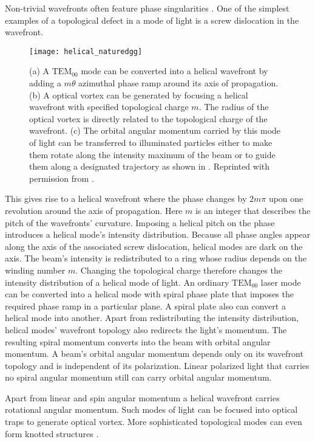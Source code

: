 Non-trivial wavefronts often feature phase singularities \cite{Bazhenov1992}.  One of the simplest examples of a topological defect in a mode of light is a screw dislocation \cite{Bazhenov1992} in the wavefront.
\begin{figure}[t!]
  \centering
  \texttt{[image: helical\_naturedgg]}
  \caption{(a) A $\mathrm{TEM}_{00}$ mode can be converted into a helical wavefront by adding a $m \theta$ azimuthal phase ramp around its axis of propagation. (b) A optical vortex can be generated by focusing a helical wavefront with specified topological charge $m$. The radius of the optical vortex is directly related to the topological charge of the wavefront. (c) The orbital angular momentum carried by this mode of light can be transferred to illuminated particles either to make them rotate along the intensity maximum of the beam or to guide them along a designated trajectory as shown in \cite{Curtis:03}. Reprinted with permission from \cite{grier2003nature}.}
  \label{fig:helical}
\end{figure}
This gives rise to a helical wavefront where the phase changes by $2m\pi$ upon one revolution around the axis of propagation. Here $m$ is an integer that describes the pitch of the wavefronts' curvature. Imposing a helical pitch on the phase introduces a helical mode's intensity distribution. Because all phase angles appear along the axis of the associated screw dislocation, helical modes are dark \cite{Bazhenov1992,nye1997} on the axis. The beam's intensity is redistributed to a ring whose radius depends on the winding number $m$. Changing the topological charge therefore changes the intensity distribution of a helical mode of light. An ordinary $\mathrm{TEM_{00}}$ laser mode can be converted into a helical mode with spiral phase plate that imposes the required phase ramp in a particular plane. A spiral plate \cite{BEIJERSBERGEN1994321} also can convert a helical mode into another. Apart from redistributing the intensity distribution, helical modes' wavefront topology also redirects the light's momentum. The resulting spiral momentum converts into the beam with orbital angular momentum. A beam's orbital angular momentum depends only on its wavefront topology and is independent of its polarization. Linear polarized light that carries no spiral angular momentum still can carry orbital angular momentum. 

Apart from linear and spin angular momentum a helical wavefront carries rotational angular momentum. Such modes of light can be focused into optical traps to generate optical vortex. More sophisticated topological modes can even form knotted structures \cite{leach2004}. 



